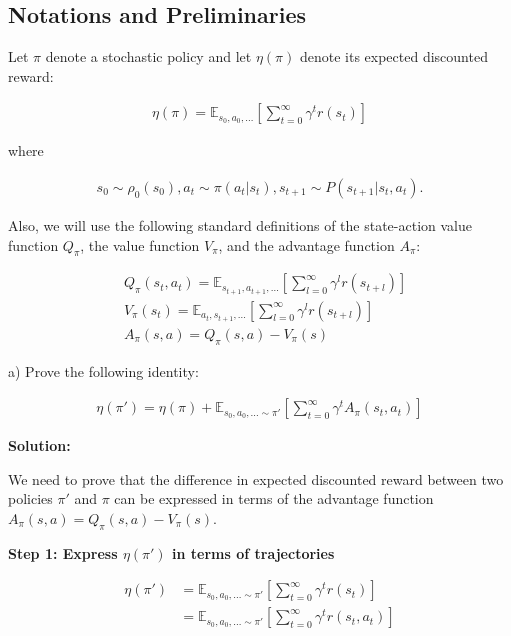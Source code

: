 \subsection{Notations and Preliminaries}

Let $\pi$ denote a stochastic policy and let $\eta(\pi)$ denote its expected discounted reward:

\begin{align*}
    \eta(\pi) = \mathbb{E}_{s_0, a_0, \ldots} [\sum_{t = 0}^{\infty} \gamma^t r(s_t)]
\end{align*}

where

\begin{align*}
    s_0 \sim \rho_0(s_0), a_t \sim \pi(a_t | s_t), s_{t + 1} \sim P(s_{t + 1} | s_t, a_t).
\end{align*}

Also, we will use the following standard definitions of the state-action value function $Q_\pi$, the value function $V_\pi$, and the advantage function $A_\pi$:

\begin{align*}
    &Q_\pi(s_t, a_t) = \mathbb{E}_{s_{t+1}, a_{t+1}, \ldots} [\sum_{l = 0}^{\infty} \gamma^l r(s_{t + l})] \\
    &V_\pi(s_t) = \mathbb{E}_{a_t, s_{t+1}, \ldots} [\sum_{l = 0}^{\infty} \gamma^l r(s_{t + l})] \\
    &A_\pi(s, a) = Q_\pi(s, a) - V_\pi(s)
\end{align*}


a) Prove the following identity:

\begin{align}\label{eq_3}
    \eta(\pi')=\eta(\pi)+\mathbb{E}_{s_{0}, a_{0}, \ldots \sim \pi'} [\sum_{t = 0}^{\infty} \gamma^t A_\pi(s_t, a_t)]
\end{align}

\textbf{Solution:}

We need to prove that the difference in expected discounted reward between two policies $\pi'$ and $\pi$ can be expressed in terms of the advantage function $A_\pi(s,a) = Q_\pi(s,a) - V_\pi(s)$.

\textbf{Step 1: Express $\eta(\pi')$ in terms of trajectories}

\begin{align}
\eta(\pi') &= \mathbb{E}_{s_0, a_0, \ldots \sim \pi'} \left[ \sum_{t = 0}^{\infty} \gamma^t r(s_t) \right] \\
&= \mathbb{E}_{s_0, a_0, \ldots \sim \pi'} \left[ \sum_{t = 0}^{\infty} \gamma^t r(s_t, a_t) \right]
\end{align}


